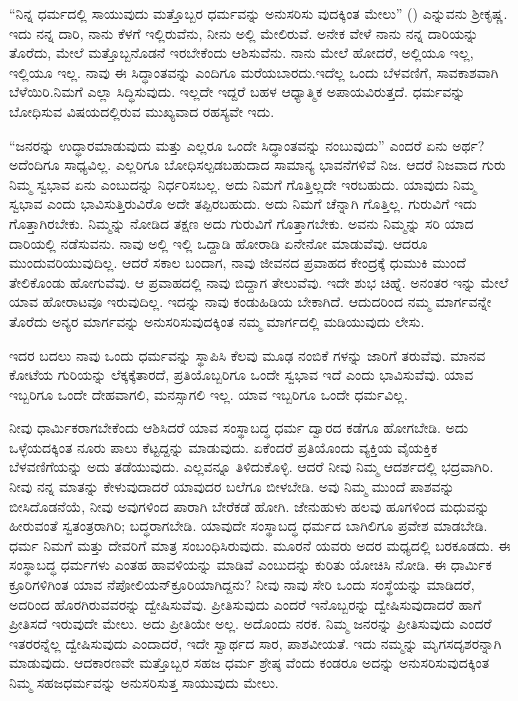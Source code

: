 “ನಿನ್ನ ಧರ್ಮದಲ್ಲಿ ಸಾಯುವುದು ಮತ್ತೊಬ್ಬರ ಧರ್ಮವನ್ನು ಅನುಸರಿಸು ವುದಕ್ಕಿಂತ ಮೇಲು” () ಎನ್ನುವನು ಶ‍್ರೀಕೃಷ್ಣ. ಇದು ನನ್ನ ದಾರಿ, ನಾನು ಕೆಳಗೆ ಇಲ್ಲಿರುವೆನು, ನೀನು ಅಲ್ಲಿ ಮೇಲಿರುವೆ. ಅನೇಕ ವೇಳೆ ನಾನು ನನ್ನ ದಾರಿಯನ್ನು ತೊರೆದು, ಮೇಲೆ ಮತ್ತೊಬ್ಬನೊಡನೆ ಇರಬೇಕೆಂದು ಆಶಿಸುವೆನು. ನಾನು ಮೇಲೆ ಹೋದರೆ, ಅಲ್ಲಿಯೂ ಇಲ್ಲ, ಇಲ್ಲಿಯೂ ಇಲ್ಲ. ನಾವು ಈ ಸಿದ್ಧಾಂತವನ್ನು ಎಂದಿಗೂ ಮರೆಯಬಾರದು.ಇದೆಲ್ಲ ಒಂದು ಬೆಳವಣಿಗೆ, ಸಾವಕಾಶವಾಗಿ ಬೆಳೆಯಿರಿ.ನಿಮಗೆ ಎಲ್ಲಾ ಸಿದ್ಧಿಸುವುದು. ಇಲ್ಲದೇ ಇದ್ದರೆ ಬಹಳ ಆಧ್ಯಾತ್ಮಿಕ ಅಪಾಯವಿರುತ್ತದೆ. ಧರ್ಮವನ್ನು ಬೋಧಿಸುವ ವಿಷಯದಲ್ಲಿರುವ ಮುಖ್ಯವಾದ ರಹಸ್ಯವೇ ಇದು.

“ಜನರನ್ನು ಉದ್ಧಾರಮಾಡುವುದು ಮತ್ತು ಎಲ್ಲರೂ ಒಂದೇ ಸಿದ್ಧಾಂತವನ್ನು ನಂಬುವುದು” ಎಂದರೆ ಏನು ಅರ್ಥ? ಅದೆಂದಿಗೂ ಸಾಧ್ಯವಿಲ್ಲ. ಎಲ್ಲರಿಗೂ ಬೋಧಿಸಲ್ಪಡಬಹುದಾದ ಸಾಮಾನ್ಯ ಭಾವನೆಗಳಿವೆ ನಿಜ. ಆದರೆ ನಿಜವಾದ ಗುರು ನಿಮ್ಮ ಸ್ವಭಾವ ಏನು ಎಂಬುದನ್ನು ನಿರ್ಧರಿಸಬಲ್ಲ. ಅದು ನಿಮಗೆ ಗೊತ್ತಿಲ್ಲದೇ ಇರಬಹುದು. ಯಾವುದು ನಿಮ್ಮ ಸ್ವಭಾವ ಎಂದು ಭಾವಿಸುತ್ತಿರುವಿರೊ ಅದೇ ತಪ್ಪಿರಬಹುದು. ಅದು ನಿಮಗೆ ಚೆನ್ನಾಗಿ ಗೊತ್ತಿಲ್ಲ. ಗುರುವಿಗೆ ಇದು ಗೊತ್ತಾಗಿರಬೇಕು. ನಿಮ್ಮನ್ನು ನೋಡಿದ ತಕ್ಷಣ ಅದು ಗುರುವಿಗೆ ಗೊತ್ತಾಗಬೇಕು. ಅವನು ನಿಮ್ಮನ್ನು ಸರಿ ಯಾದ ದಾರಿಯಲ್ಲಿ ನಡೆಸುವನು. ನಾವು ಅಲ್ಲಿ ಇಲ್ಲಿ ಒದ್ದಾಡಿ ಹೋರಾಡಿ ಏನೇನೋ ಮಾಡುವೆವು. ಆದರೂ ಮುಂದುವರಿಯುವುದಿಲ್ಲ. ಆದರೆ ಸಕಾಲ ಬಂದಾಗ, ನಾವು ಜೀವನದ ಪ್ರವಾಹದ ಕೇಂದ್ರಕ್ಕೆ ಧುಮುಕಿ ಮುಂದೆ ತೇಲಿಕೊಂಡು ಹೋಗುವೆವು. ಆ ಪ್ರವಾಹದಲ್ಲಿ ನಾವು ಬಿದ್ದಾಗ ತೇಲುವೆವು. ಇದೇ ಶುಭ ಚಿಹ್ನೆ. ಅನಂತರ ಇನ್ನು ಮೇಲೆ ಯಾವ ಹೋರಾಟವೂ ಇರುವುದಿಲ್ಲ. ಇದನ್ನು ನಾವು ಕಂಡುಹಿಡಿಯ ಬೇಕಾಗಿದೆ. ಆದುದರಿಂದ ನಮ್ಮ ಮಾರ್ಗವನ್ನೇ ತೊರೆದು ಅನ್ಯರ ಮಾರ್ಗವನ್ನು ಅನುಸರಿಸುವುದಕ್ಕಿಂತ ನಮ್ಮ ಮಾರ್ಗದಲ್ಲಿ ಮಡಿಯುವುದು ಲೇಸು.

ಇದರ ಬದಲು ನಾವು ಒಂದು ಧರ್ಮವನ್ನು ಸ್ಥಾಪಿಸಿ ಕೆಲವು ಮೂಢ ನಂಬಿಕೆ ಗಳನ್ನು ಜಾರಿಗೆ ತರುವೆವು. ಮಾನವ ಕೋಟೆಯ ಗುರಿಯನ್ನು ಲೆಕ್ಕಕ್ಕೆತಾರದೆ, ಪ್ರತಿಯೊಬ್ಬರಿಗೂ ಒಂದೇ ಸ್ವಭಾವ ಇದೆ ಎಂದು ಭಾವಿಸುವೆವು. ಯಾವ ಇಬ್ಬರಿಗೂ ಒಂದೇ ದೇಹವಾಗಲಿ, ಮನಸ್ಸಾಗಲಿ ಇಲ್ಲ. ಯಾವ ಇಬ್ಬರಿಗೂ ಒಂದೇ ಧರ್ಮವಿಲ್ಲ.

ನೀವು ಧಾರ್ಮಿಕರಾಗಬೇಕೆಂದು ಆಶಿಸಿದರೆ ಯಾವ ಸಂಸ್ಥಾಬದ್ಧ ಧರ್ಮ ದ್ವಾರದ ಕಡೆಗೂ ಹೋಗಬೇಡಿ. ಅದು ಒಳ್ಳೆಯದಕ್ಕಿಂತ ನೂರು ಪಾಲು ಕೆಟ್ಟದ್ದನ್ನು ಮಾಡುವುದು. ಏಕೆಂದರೆ ಪ್ರತಿಯೊಂದು ವ್ಯಕ್ತಿಯ ವೈಯಕ್ತಿಕ ಬೆಳವಣಿಗೆಯನ್ನು ಅದು ತಡೆಯುವುದು. ಎಲ್ಲವನ್ನೂ ತಿಳಿದುಕೊಳ್ಳಿ. ಆದರೆ ನೀವು ನಿಮ್ಮ ಆದರ್ಶದಲ್ಲಿ ಭದ್ರವಾಗಿರಿ. ನೀವು ನನ್ನ ಮಾತನ್ನು ಕೇಳುವುದಾದರೆ ಯಾವುದರ ಬಲೆಗೂ ಬೀಳಬೇಡಿ. ಅವು ನಿಮ್ಮ ಮುಂದೆ ಪಾಶವನ್ನು ಬೀಸಿದೊಡನೆಯೆ, ನೀವು ಅವುಗಳಿಂದ ಪಾರಾಗಿ ಬೇರೆಕಡೆ ಹೋಗಿ. ಜೇನುಹುಳು ಹಲವು ಹೂಗಳಿಂದ ಮಧುವನ್ನು ಹೀರುವಂತೆ ಸ್ವತಂತ್ರರಾಗಿರಿ; ಬದ್ಧರಾಗಬೇಡಿ. ಯಾವುದೇ ಸಂಸ್ಥಾಬದ್ಧ ಧರ್ಮದ ಬಾಗಿಲಿಗೂ ಪ್ರವೇಶ ಮಾಡಬೇಡಿ. ಧರ್ಮ ನಿಮಗೆ ಮತ್ತು ದೇವರಿಗೆ ಮಾತ್ರ ಸಂಬಂಧಿಸಿರುವುದು. ಮೂರನೆ ಯವರು ಅದರ ಮಧ್ಯದಲ್ಲಿ ಬರಕೂಡದು. ಈ ಸಂಸ್ಥಾಬದ್ಧ ಧರ್ಮಗಳು ಎಂತಹ ಹಾವಳಿಯನ್ನು ಮಾಡಿವೆ ಎಂಬುದನ್ನು ಕುರಿತು ಯೋಚಿಸಿ ನೋಡಿ. ಈ ಧಾರ್ಮಿಕ ಕ್ರೂರಿಗಳಿಗಿಂತ ಯಾವ ನೆಪೋಲಿಯನ್​ಕ್ರೂರಿಯಾಗಿದ್ದನು? ನೀವು ನಾವು ಸೇರಿ ಒಂದು ಸಂಸ್ಥೆಯನ್ನು ಮಾಡಿದರೆ, ಅದರಿಂದ ಹೊರಗಿರುವವರನ್ನು ದ್ವೇಷಿಸುವೆವು. ಪ್ರೀತಿಸುವುದು ಎಂದರೆ ಇನೊಬ್ಬರನ್ನು ದ್ವೇಷಿಸುವುದಾದರೆ ಹಾಗೆ ಪ್ರೀತಿಸದೆ ಇರುವುದೇ ಮೇಲು. ಅದು ಪ್ರೀತಿಯೇ ಅಲ್ಲ. ಅದೊಂದು ನರಕ. ನಿಮ್ಮ ಜನರನ್ನು ಪ್ರೀತಿಸುವುದು ಎಂದರೆ ಇತರರನ್ನೆಲ್ಲ ದ್ವೇಷಿಸುವುದು ಎಂದಾದರೆ, ಇದೇ ಸ್ವಾರ್ಥದ ಸಾರ, ಪಾಶವೀಯತೆ. ಇದು ನಮ್ಮನ್ನು ಮೃಗಸದೃಶರನ್ನಾಗಿ ಮಾಡುವುದು. ಆದಕಾರಣವೇ ಮತ್ತೊಬ್ಬರ ಸಹಜ ಧರ್ಮ ಶ್ರೇಷ್ಠ ವೆಂದು ಕಂಡರೂ ಅದನ್ನು ಅನುಸರಿಸುವುದಕ್ಕಿಂತ ನಿಮ್ಮ ಸಹಜಧರ್ಮವನ್ನು ಅನುಸರಿಸುತ್ತ ಸಾಯುವುದು ಮೇಲು.

